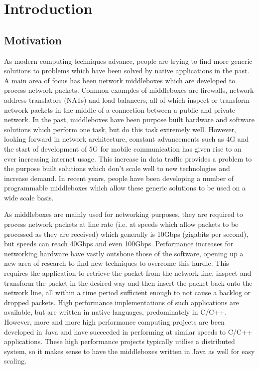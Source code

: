 \documentclass[final_report.tex]{subfiles}
\begin{document}
\section{Introduction}

\subsection{Motivation}
As modern computing techniques advance, people are trying to find more generic solutions to problems which have been solved by native applications in the past. A main area of focus has been network middleboxes which are developed to process network packets. Common examples of middleboxes are firewalls, network address translators (NATs) and load balancers, all of which inspect or transform network packets in the middle of a connection between a public and private network. In the past, middleboxes have been purpose built hardware and software solutions which perform one task, but do this task extremely well. However, looking forward in network architecture, constant advancements such as 4G and the start of development of 5G for mobile communication has given rise to an ever increasing internet usage. This increase in data traffic provides a problem to the purpose built solutions which don't scale well to new technologies and increase demand. In recent years, people have been developing a number of programmable middleboxes which allow these generic solutions to be used on a wide scale basis.

As middleboxes are mainly used for networking purposes, they are required to process network packets at line rate (i.e. at speeds which allow packets to be processed as they are received) which generally is 10Gbps (gigabits per second), but speeds can reach 40Gbps and even 100Gbps. Performance increases for networking hardware have vastly outshone those of the software, opening up a new area of research to find new techniques to overcome this hurdle. This requires the application to retrieve the packet from the network line, inspect and transform the packet in the desired way and then insert the packet back onto the network line, all within a time period sufficient enough to not cause a backlog or dropped packets. High performance implementations of such applications are available, but are written in native languages, predominately in C/C++. However, more and more high performance computing projects are been developed in Java and have succeeded in performing at similar speeds to C/C++ applications. These high performance projects typically utilise a distributed system, so it makes sense to have the middleboxes written in Java as well for easy scaling.
\end{document}
